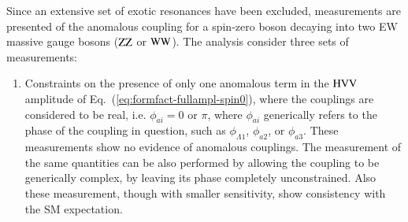 Since an extensive set of exotic resonances have been excluded,
measurements are presented of the anomalous coupling for a spin-zero
boson decaying into two EW massive gauge bosons ($\mathrm{Z}\mathrm{Z}$ or
$\mathrm{W}\mathrm{W}$).
%
The analysis consider three sets of measurements:
%
\begin{enumerate}
\item Constraints on the presence of only one anomalous term in the
  $\mathrm{H}\mathrm{V}\mathrm{V}$ amplitude of Eq.~(\ref{eq:formfact-fullampl-spin0}), where
  the couplings are considered to be real, i.e. $\phi_{ai}=0$ or
  $\pi$, where $\phi_{ai}$ generically refers to the phase of the
  coupling in question, such as $\phi_{\Lambda1}$, $\phi_{a2}$, or
  $\phi_{a3}$. 
  These measurements show no evidence of anomalous couplings.  The
  measurement of the same quantities can be also performed by allowing
  the coupling to be generically complex, by leaving its phase
  completely unconstrained. Also these measurement, though with
  smaller sensitivity, show consistency with the SM expectation. 

  



\end{enumerate}
